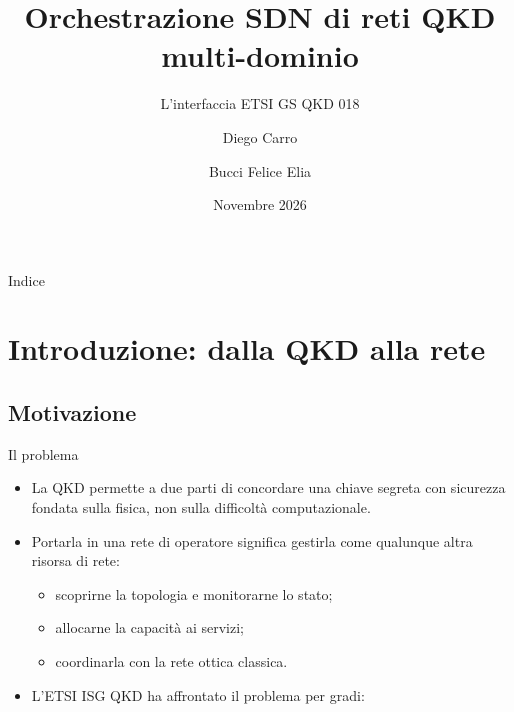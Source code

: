 \documentclass[10pt]{beamer}
\title[ETSI GS QKD 018]{Orchestrazione SDN di reti QKD multi-dominio}
\subtitle{L'interfaccia ETSI GS QKD 018}
\author[D.~Carro, F.~E.~Bucci]{Diego Carro \and Bucci Felice Elia}
\institute[PoliTo]{Corso di Cybersecurity, Politecnico di Torino\\Quantum Engineering}
\date{Novembre 2026}
\begin{document}
\begin{frame}
  \titlepage
\end{frame}

\begin{frame}{Indice}
  \tableofcontents[hideallsubsections]
\end{frame}

\section[Introduzione]{Introduzione: dalla QKD alla rete}

\subsection{Motivazione}

\begin{frame}{Il problema}
  \begin{itemize}
    \item La QKD permette a due parti di concordare una chiave segreta con
          sicurezza fondata sulla \alert{fisica}, non sulla difficoltà
          computazionale.
    \item Portarla in una rete di operatore significa gestirla come
          qualunque altra \alert{risorsa di rete}:
          \begin{itemize}
            \item scoprirne la topologia e monitorarne lo stato;
            \item allocarne la capacità ai servizi;
            \item coordinarla con la rete ottica classica.
          \end{itemize}
    \item L'ETSI ISG QKD ha affrontato il problema per gradi:
  \end{itemize}
  \vspace{1ex}
  \begin{center}
  \end{center}
\end{frame}
\end{document}
